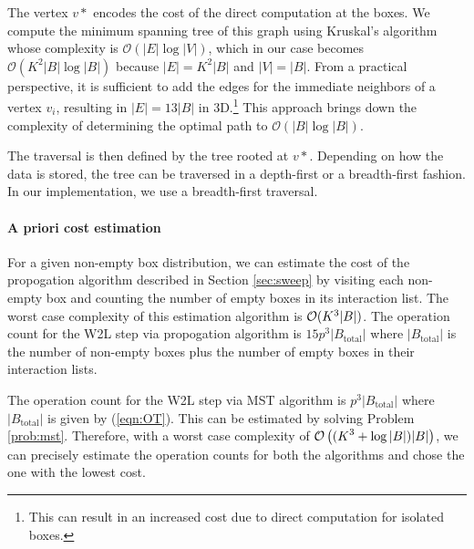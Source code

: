 The vertex $v*$ encodes the cost of the direct computation at the boxes. We compute the minimum spanning tree of this graph using Kruskal's algorithm \cite{kruskal56} whose complexity is $\mathcal{O}(|E| \log |V|)$, which in our case becomes $\mathcal{O}(K^2 |B| \log |B|)$ because $|E| = K^2 |B|$ and $|V| = |B|$. From a practical perspective, it is sufficient to add the edges for the immediate neighbors of a vertex $v_i$, resulting in $|E| = 13 |B|$ in 3D.\footnote{This can result in an increased cost due to direct computation for isolated boxes.} This approach brings down the complexity of determining the optimal path to $\mathcal{O}(|B| \log |B|)$. 

The traversal is then defined by the tree rooted at $v*$. Depending on how the data is stored, the tree can be traversed in a depth-first or a breadth-first fashion. In our implementation, we use a breadth-first traversal. 
   

\paragraph{A priori cost estimation} For a given non-empty box distribution, we can estimate the cost of the propogation algorithm  described in Section \ref{sec:sweep} by visiting each non-empty box and counting the number of empty boxes in its interaction list. The worst case complexity of this estimation algorithm is $\mathcal{O}(K^3 |B|)$. The operation count for the W2L step via propogation algorithm is $15 p^3 |B_{\text{total}}|$ where $|B_{\text{total}}|$ is the number of non-empty boxes plus the number of empty boxes in their interaction lists. 

The operation count for the W2L step via MST algorithm is $p^3 |B_{\text{total}}|$ where $|B_{\text{total}}|$ is given by (\ref{eqn:OT}). This can be estimated by solving Problem \ref{prob:mst}. Therefore, with a worst case complexity of $\displaystyle \mathcal{O} \left((K^3 + \log |B|) |B|\right)$, we can precisely estimate the operation counts for both the algorithms and chose the one with the lowest cost. 

